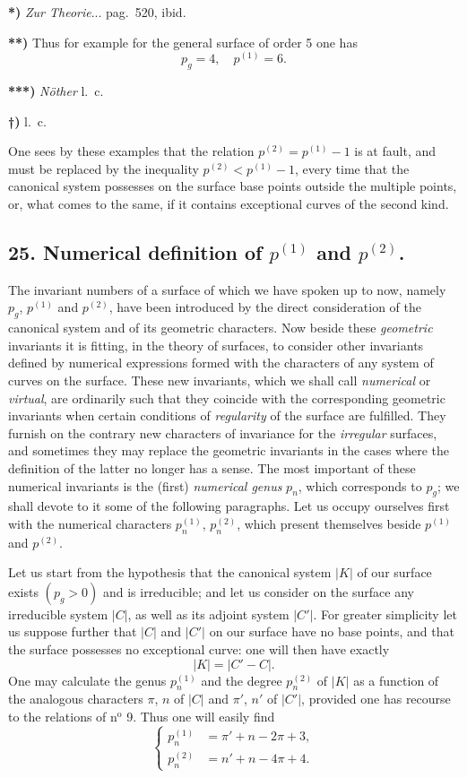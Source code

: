 \documentclass{article}
\begin{document}
\textbf{*)} \emph{Zur Theorie}... pag.\ 520, ibid.

\textbf{**)} Thus for example for the general surface of order 5 one has
\[
p_{g} = 4, \quad p^{(1)} = 6.
\]

\textbf{***)} \emph{Nöther} l.\ c.

\textbf{†)} l.\ c.


One sees by these examples that the relation $p^{(2)} = p^{(1)} - 1$ is at fault, and must be replaced by the inequality $p^{(2)} < p^{(1)} - 1$, every time that the canonical system possesses on the surface base points outside the multiple points, or, what comes to the same, if it contains exceptional curves of the second kind.

\subsection*{25. Numerical definition of $p^{(1)}$ and $p^{(2)}$.}

The invariant numbers of a surface of which we have spoken up to now, namely $p_{g}$, $p^{(1)}$ and $p^{(2)}$, have been introduced by the direct consideration of the canonical system and of its geometric characters. Now beside these \emph{geometric} invariants it is fitting, in the theory of surfaces, to consider other invariants defined by numerical expressions formed with the characters of any system of curves on the surface. These new invariants, which we shall call \emph{numerical} or \emph{virtual}, are ordinarily such that they coincide with the corresponding geometric invariants when certain conditions of \emph{regularity} of the surface are fulfilled. They furnish on the contrary new characters of invariance for the \emph{irregular} surfaces, and sometimes they may replace the geometric invariants in the cases where the definition of the latter no longer has a sense. The most important of these numerical invariants is the (first) \emph{numerical genus} $p_{n}$, which corresponds to $p_{g}$; we shall devote to it some of the following paragraphs. Let us occupy ourselves first with the numerical characters $p_{n}^{(1)}$, $p_{n}^{(2)}$, which present themselves beside $p^{(1)}$ and $p^{(2)}$.

Let us start from the hypothesis that the canonical system $|K|$ of our surface exists $(p_{g} > 0)$ and is irreducible; and let us consider on the surface any irreducible system $|C|$, as well as its adjoint system $|C'|$. For greater simplicity let us suppose further that $|C|$ and $|C'|$ on our surface have no base points, and that the surface possesses no exceptional curve: one will then have exactly
\[
|K| = |C' - C|.
\]
One may calculate the genus $p_{n}^{(1)}$ and the degree $p_{n}^{(2)}$ of $|K|$ as a function of the analogous characters $\pi$, $n$ of $|C|$ and $\pi'$, $n'$ of $|C'|$, provided one has recourse to the relations of n${}^{\text{o}}$ 9. Thus one will easily find
\[
\left\{
\begin{aligned}
p_{n}^{(1)} &= \pi' + n - 2\pi + 3,\\
p_{n}^{(2)} &= n' + n - 4\pi + 4.
\end{aligned}
\right.
\tag{1}
\]
\end{document}
